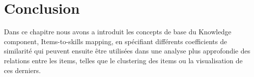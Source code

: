 \section{Conclusion} 
Dans ce chapitre nous avons a introduit les concepts de base du Knowledge component, Items-to-skills mapping, en spécifiant différents coefficients de similarité qui peuvent ensuite être utilisées dans une analyse plus approfondie des relations entre les items, telles que le clustering des items ou la visualisation de ces derniers.